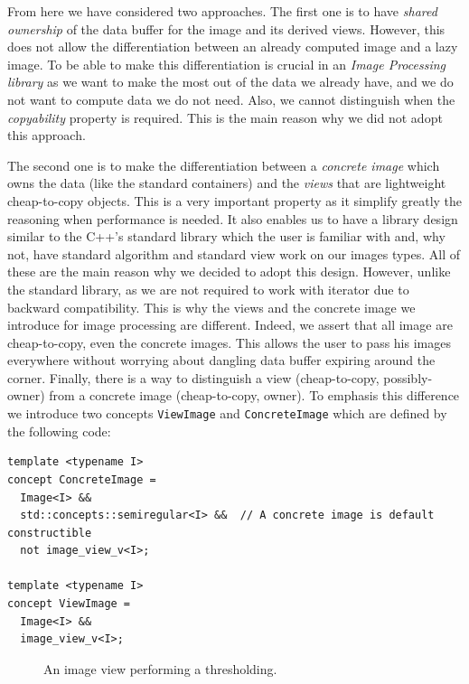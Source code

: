 From here we have considered two approaches. The first one is to have \emph{shared ownership} of the data buffer for the
image and its derived views. However, this does not allow the differentiation between an already computed image and a
lazy image. To be able to make this differentiation is crucial in an \emph{Image Processing library} as we want to make
the most out of the data we already have, and we do not want to compute data we do not need. Also, we cannot distinguish
when the \emph{copyability} property is required. This is the main reason why we did not adopt this approach.

The second one is to make the differentiation between a \emph{concrete image} which owns the data (like the standard
containers) and the \emph{views} that are lightweight cheap-to-copy objects. This is a very important property as it
simplify greatly the reasoning when performance is needed. It also enables us to have a library design similar to the
C++'s standard library which the user is familiar with and, why not, have standard algorithm and standard view work on
our images types. All of these are the main reason why we decided to adopt this design. However, unlike the standard
library, as we are not required to work with iterator due to backward compatibility. This is why the views and the
concrete image we introduce for image processing are different. Indeed, we assert that all image are cheap-to-copy, even
the concrete images. This allows the user to pass his images everywhere without worrying about dangling data buffer
expiring around the corner. Finally, there is a way to distinguish a view (cheap-to-copy, possibly-owner) from a
concrete image (cheap-to-copy, owner). To emphasis this difference we introduce two concepts \texttt{ViewImage} and
\texttt{ConcreteImage} which are defined by the following code:
\begin{verbatim}
template <typename I>
concept ConcreteImage =
  Image<I> &&
  std::concepts::semiregular<I> &&  // A concrete image is default constructible
  not image_view_v<I>;

template <typename I>
concept ViewImage =
  Image<I> &&
  image_view_v<I>;
\end{verbatim}

\begin{figure}[htbp]
  \centering
  \begin{minipage}{\linewidth}
    
  \end{minipage}
  \caption{An image view performing a thresholding.}
  \label{fig.view.threshold}
\end{figure}

